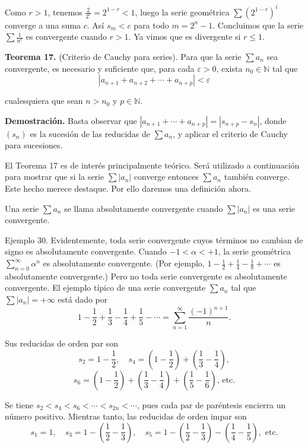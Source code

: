 \documentclass[12pt,oneside]{book}
\begin{document}
Como \(r > 1\), tenemos \(\frac{2}{2^r} = 2^{1-r} < 1\), luego la serie geométrica \(\sum \left(2^{1-r}\right)^i\) converge a una suma \(c\). Así \(s_m < c\) para todo \(m = 2^n - 1\). Concluimos que la serie \(\sum \frac{1}{n^r}\) es convergente cuando \(r > 1\). Ya vimos que es divergente si \(r \leq 1\).

\textbf{Teorema 17.} (Criterio de Cauchy para series). Para que la serie \(\sum a_n\) sea convergente, es necesario y suficiente que, para cada \(\varepsilon > 0\), exista \(n_0 \in \mathbb{N}\) tal que
\[
|a_{n+1} + a_{n+2} + \cdots + a_{n+p}| < \varepsilon
\]

cualesquiera que sean \(n > n_0\) y \(p \in \mathbb{N}\).

\textbf{Demostración.} Basta observar que \(|a_{n+1} + \cdots + a_{n+p}| = |s_{n+p} - s_n|\), donde \((s_n)\) es la sucesión de las reducidas de \(\sum a_n\), y aplicar el criterio de Cauchy para sucesiones.

El Teorema 17 es de interés principalmente teórico. Será utilizado a continuación para mostrar que si la serie \(\sum |a_n|\) converge entonces \(\sum a_n\) también converge. Este hecho merece destaque. Por ello daremos una definición ahora.

Una serie \(\sum a_n\) se llama absolutamente convergente cuando \(\sum |a_n|\) es una serie convergente.

Ejemplo 30. Evidentemente, toda serie convergente cuyos términos no cambian de signo es absolutamente convergente. Cuando \(-1 < \alpha < +1\), la serie geométrica \(\sum_{n=0}^{\infty} \alpha^n\) es absolutamente convergente. (Por ejemplo, \(1 - \frac{1}{2} + \frac{1}{4} - \frac{1}{8} + \cdots\) es absolutamente convergente.) Pero no toda serie convergente es absolutamente convergente. El ejemplo típico de una serie convergente \(\sum a_n\) tal que \(\sum |a_n| = +\infty\) está dado por
\[
1 - \frac{1}{2} + \frac{1}{3} - \frac{1}{4} + \frac{1}{5} - \cdots = \sum_{n=1}^{\infty} \frac{(-1)^{n+1}}{n}.
\]

Sus reducidas de orden par son
\[
s_2 = 1 - \frac{1}{2}, \quad s_4 = \left(1 - \frac{1}{2}\right) + \left(\frac{1}{3} - \frac{1}{4}\right),
\]
\[
s_6 = \left(1 - \frac{1}{2}\right) + \left(\frac{1}{3} - \frac{1}{4}\right) + \left(\frac{1}{5} - \frac{1}{6}\right) \text{, etc.}
\]

Se tiene \(s_2 < s_4 < s_6 < \cdots < s_{2n} < \cdots\), pues cada par de paréntesis encierra un número positivo. Mientras tanto, las reducidas de orden impar son
\[
s_1 = 1, \quad s_3 = 1 - \left(\frac{1}{2} - \frac{1}{3}\right), \quad s_5 = 1 - \left(\frac{1}{2} - \frac{1}{3}\right) - \left(\frac{1}{4} - \frac{1}{5}\right), \text{ etc.}
\]
\end{document}
